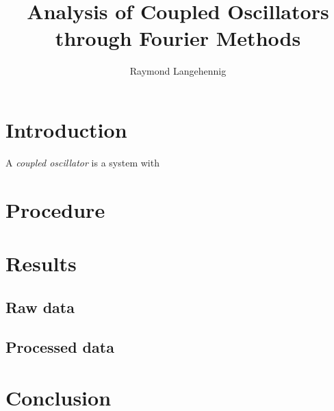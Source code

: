 \documentclass{article}
\title{Analysis of Coupled Oscillators through Fourier Methods}
\author{Raymond Langehennig}
\begin{document}
\maketitle

\section{Introduction}
A \emph{coupled oscillator} is a system with 

\section{Procedure}

\section{Results}
\subsection{Raw data}
\subsection{Processed data}

\section{Conclusion}
\end{document}
